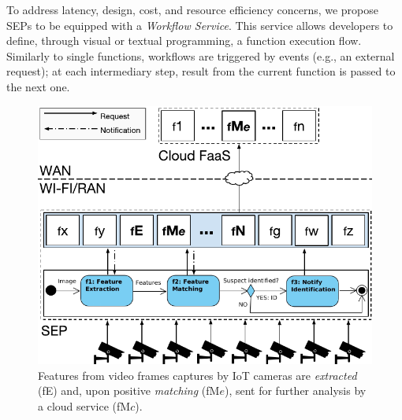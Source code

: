 To address latency, design, cost, and resource efficiency concerns, we propose SEPs to be equipped with a \textit{Workflow Service}. This service allows developers to define, through visual or textual programming, a function execution flow.
Similarly to single functions, workflows are triggered by events (e.g., an external request); at each intermediary step, result from the current function is passed to the next one. 

\begin{figure}[bp]
	\centering
	\includegraphics[width=1\linewidth]{Figs/Edge_Data_Analytics_Video_Surveillance.pdf}
	\caption{Features from video frames captures by IoT cameras are \textit{extracted} (fE) and, upon positive \textit{matching} (fM$e$), sent for further analysis by a cloud service (fM$c$).}
	\label{fig:Edge_Data_Analytics_Video_Surveillance}
\end{figure}

